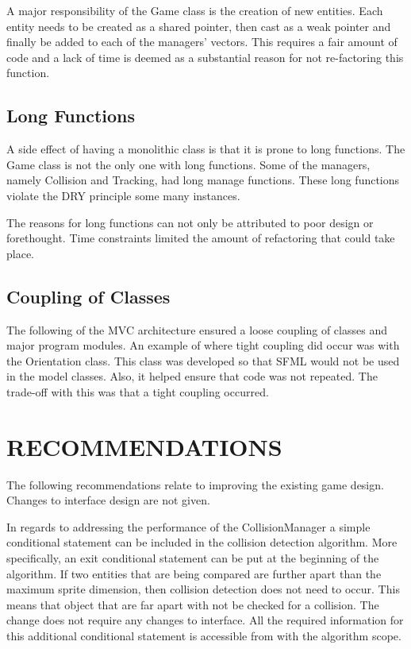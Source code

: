 \documentclass[10pt,twocolumn]{witseiepaper}
\begin{document}
A major responsibility of the Game class is the creation of new entities. Each entity needs to be created as a shared pointer, then cast as a weak pointer and finally be added to each of the managers' vectors. This requires a fair amount of code and a lack of time is deemed as a substantial reason for not re-factoring this function.

\subsection{Long Functions}
A side effect of having a monolithic class is that it is prone to long functions. The Game class is not the only one with long functions. Some of the managers, namely Collision and Tracking, had long manage functions. These long functions violate the DRY principle some many instances.

The reasons for long functions can not only be attributed to poor design or forethought. Time constraints limited the amount of refactoring that could take place. 

\subsection{Coupling of Classes}
The following of the MVC architecture ensured a loose coupling of classes and major program modules. An example of where tight coupling did occur was with the Orientation class. This class was developed so that SFML would not be used in the model classes. Also, it helped ensure that code was not repeated. The trade-off with this was that a tight coupling occurred.

%
\section{RECOMMENDATIONS} %

The following recommendations relate to improving the existing game design. Changes to interface design are not given.

In regards to addressing the performance of the CollisionManager a simple conditional statement can be included in the collision detection algorithm. More specifically, an exit conditional statement can be put at the beginning of the algorithm. If two entities that are being compared are further apart than the maximum sprite dimension, then collision detection does not need to occur. This means that object that are far apart with not be checked for a collision. The change does not require any changes to interface. All the required information for this additional conditional statement is accessible from with the algorithm scope.
\end{document}

